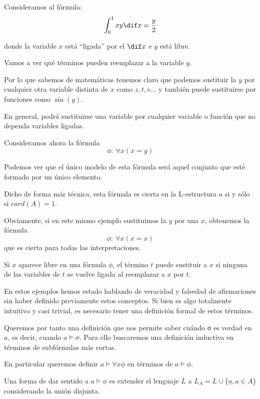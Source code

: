 \begin{example}

Consideramos al fórmula:
\[\int_0^1 xy \dif x = \frac{y}{2}\]

donde la variable $x$ está ``ligada'' por el $\dif x$ e $y$ está libre.

Vamos a ver qué términos pueden reemplazar a la variable $y$.

Por lo que sabemos de matemáticas tenemos claro que podemos sustituir la $y$ por cualquier otra variable distinta de $x$ como $z,t,v...$ y también puede sustituirse por funciones como $\sin(y)$.

En general, podrá sustituirse una variable por cualquier variable o función que no dependa variables ligadas.
\end{example}

\begin{example}
Consideramos ahora la fórmula
\[\phi: \ \forall x (x=y)\]

Podemos ver que el único modelo de esta fórmula será aquel conjunto que esté formado por un único elemento.

Dicho de forma más técnica, esta fórmula es cierta en la L-estructura $a$ si y sólo si $card(A)=1$.

Obviamente, si en este mismo ejemplo sustituimos la $y$ por una $x$, obtenemos la fórmula
\[\phi: \ \forall x (x=x)\]
que es cierta para todas las interpretaciones.
\end{example}

\begin{prop}
Si $x$ aparece libre en una fórmula $\phi$, el término $t$ puede sustituir a $x$ si ninguna de las variables de $t$ se vuelve ligada al reemplazar a $x$ por $t$.
\end{prop}

En estos ejemplos hemos estado hablando de veracidad y falsedad de afirmaciones sin haber definido previamente estos conceptos. Si bien es algo totalmente intuitivo y casi trivial, es necesario tener una definición formal de estos términos.

Queremos por tanto una definición que nos permite saber cuándo σ es verdad en $a$, es decir, cuando $a\vDash σ$. Para ello buscaremos una definición inductiva en términos de subfórmulas más cortas.

En particular queremos definir $a \vDash \forall x \phi$ en términos de $a \vDash \phi$.

Una forma de dar sentido a $a\vDash \phi$ es extender el lenguaje $L$ a  $L_A=L\cup\{\underline{a}, a \in A\}$ considerando la unión disjunta.

